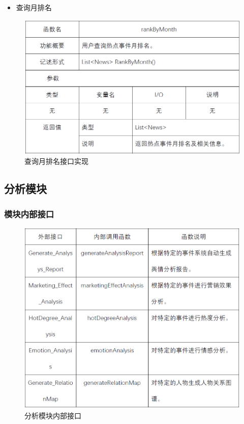 \begin{itemize}
	\item 查询月排名
\end{itemize}
\begin{figure}[!htbp]
	\centering
	\includegraphics[scale=0.7]{image/b20.png} %
	\caption{查询月排名接口实现} %
\end{figure}
\subsection{分析模块}
\subsubsection{模块内部接口}
\begin{figure}[!htbp]
	\centering
	\includegraphics[scale=0.7]{image/b21.png} %
	\caption{分析模块内部接口} %
\end{figure}

